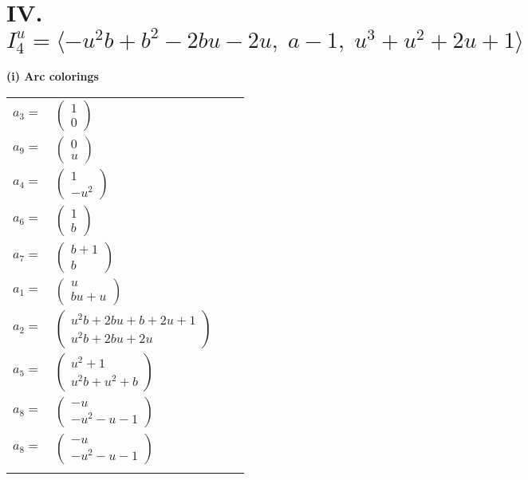 \documentclass[1p]{elsarticle_modified}
\theoremstyle{definition}
\begin{document}
\centering \section*{IV. $I^u_{4}= \langle - u^2 b+b^2-2 b u-2 u,\;a-1,\;u^3+u^2+2 u+1 \rangle$}
\flushleft \textbf{(i) Arc colorings}\\
\begin{tabular}{m{7pt} m{180pt} m{7pt} m{180pt} }
\flushright $a_{3}=$&$\begin{pmatrix}1\\0\end{pmatrix}$ \\
\flushright $a_{9}=$&$\begin{pmatrix}0\\u\end{pmatrix}$ \\
\flushright $a_{4}=$&$\begin{pmatrix}1\\- u^2\end{pmatrix}$ \\
\flushright $a_{6}=$&$\begin{pmatrix}1\\b\end{pmatrix}$ \\
\flushright $a_{7}=$&$\begin{pmatrix}b+1\\b\end{pmatrix}$ \\
\flushright $a_{1}=$&$\begin{pmatrix}u\\b u+u\end{pmatrix}$ \\
\flushright $a_{2}=$&$\begin{pmatrix}u^2 b+2 b u+b+2 u+1\\u^2 b+2 b u+2 u\end{pmatrix}$ \\
\flushright $a_{5}=$&$\begin{pmatrix}u^2+1\\u^2 b+u^2+b\end{pmatrix}$ \\
\flushright $a_{8}=$&$\begin{pmatrix}- u\\- u^2- u-1\end{pmatrix}$\\ \flushright $a_{8}=$&$\begin{pmatrix}- u\\- u^2- u-1\end{pmatrix}$\\&\end{tabular}
\end{document}
